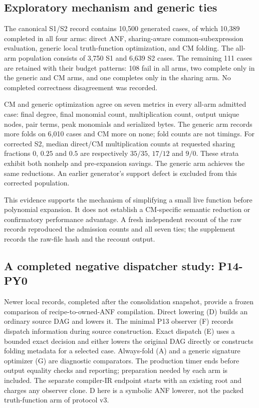\subsection{Exploratory mechanism and generic ties}
\label{sec:mechanism-evidence}

The canonical S1/S2 record contains 10,500 generated cases, of which 10,389
completed in all four arms: direct ANF, sharing-aware common-subexpression
evaluation, generic local truth-function optimization, and CM folding. The
all-arm population consists of 3,750 S1 and 6,639 S2 cases. The remaining 111
cases are retained with their budget patterns: 108 fail in all arms, two
complete only in the generic and CM arms, and one completes only in the
sharing arm. No completed correctness disagreement was recorded.

CM and generic optimization agree on seven metrics in every all-arm admitted
case: final degree, final monomial count, multiplication count, output unique
nodes, pair terms, peak monomials and serialized bytes. The generic arm records
more folds on 6,010 cases and CM more on none; fold counts are not timings.
For corrected S2, median direct/CM multiplication counts at requested sharing
fractions $0$, $0.25$ and $0.5$ are respectively $35/35$, $17/12$ and $9/0$.
These strata exhibit both nonhelp and pre-expansion savings. The generic arm
achieves the same reductions. An earlier generator's support defect is
excluded from this corrected population.

This evidence supports the mechanism of simplifying a small live function
before polynomial expansion. It does not establish a CM-specific semantic
reduction or confirmatory performance advantage. A fresh independent recount
of the raw records reproduced the admission counts and all seven ties; the
supplement records the raw-file hash and the recount output.

\subsection{A completed negative dispatcher study: P14-PY0}
\label{sec:p14}

Newer local records, completed after the consolidation snapshot, provide a
frozen comparison of recipe-to-owned-ANF compilation. Direct lowering (D)
builds an ordinary source DAG and lowers it. The minimal P13 observer (F)
records dispatch information during source construction. Exact dispatch (E)
uses a bounded exact decision and either lowers the original DAG directly or
constructs folding metadata for a selected case. Always-fold (A) and a generic
signature optimizer (G) are diagnostic comparators. The production timer ends
before output equality checks and reporting; preparation needed by each arm
is included. The separate compiler-IR endpoint starts with an existing root
and charges any observer clone. D here is a symbolic ANF lowerer, not the
packed truth-function arm of protocol v3.

